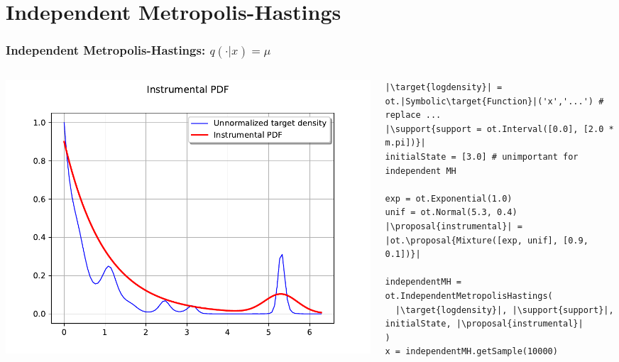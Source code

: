 \documentclass{beamer}
\newcommand{\target}[1]{\textcolor{red}{#1}}
\newcommand{\proposal}[1]{\textcolor{blue}{#1}}
\newcommand{\support}[1]{\textcolor{orange}{#1}}
\begin{document}
\section{Independent Metropolis-Hastings}
\begin{frame}[containsverbatim]
    \frametitle{Independent Metropolis-Hastings: $q(\cdot | x) = \mu$}
\begin{columns}
    \begin{column}{0.4\textwidth}
        \includegraphics[width=\textwidth]{figures/instrumental}
    \end{column}
    \begin{column}{0.6\textwidth}
        \begin{lstlisting}
|\target{logdensity}| = ot.|Symbolic\target{Function}|('x','...') # replace ...
|\support{support = ot.Interval([0.0], [2.0 * m.pi])}|
initialState = [3.0] # unimportant for independent MH

exp = ot.Exponential(1.0)
unif = ot.Normal(5.3, 0.4)
|\proposal{instrumental}| = |ot.\proposal{Mixture([exp, unif], [0.9, 0.1])}|

independentMH = ot.IndependentMetropolisHastings(
  |\target{logdensity}|, |\support{support}|, initialState, |\proposal{instrumental}|
)
x = independentMH.getSample(10000)
        \end{lstlisting}
    \end{column}
\end{columns}


\end{frame}
\end{document}
